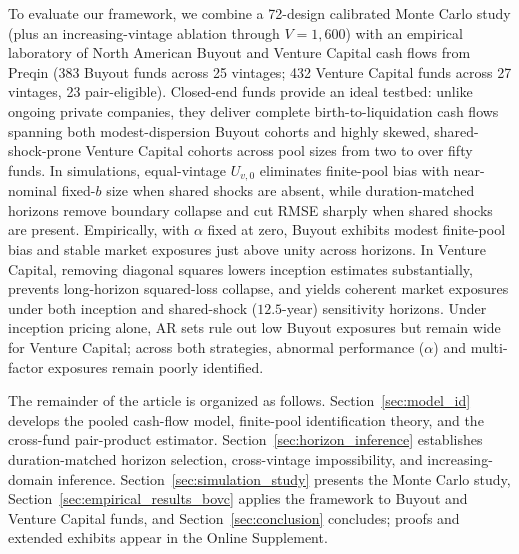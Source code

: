 \documentclass[12pt]{article}
\begin{document}
To evaluate our framework, we combine a 72-design calibrated Monte Carlo study (plus an increasing-vintage ablation through $V = 1{,}600$) with an empirical laboratory of North American Buyout and Venture Capital cash flows from Preqin (383 Buyout funds across 25 vintages; 432 Venture Capital funds across 27 vintages, 23 pair-eligible).
Closed-end funds provide an ideal testbed: unlike ongoing private companies, they deliver complete birth-to-liquidation cash flows spanning both modest-dispersion Buyout cohorts and highly skewed, shared-shock-prone Venture Capital cohorts across pool sizes from two to over fifty funds.
In simulations, equal-vintage $U_{v,0}$ eliminates finite-pool bias with near-nominal fixed-$b$ size when shared shocks are absent, while duration-matched horizons remove boundary collapse and cut RMSE sharply when shared shocks are present.
Empirically, with $\alpha$ fixed at zero, Buyout exhibits modest finite-pool bias and stable market exposures just above unity across horizons.
In Venture Capital, removing diagonal squares lowers inception estimates substantially, prevents long-horizon squared-loss collapse, and yields coherent market exposures under both inception and shared-shock ($12.5$-year) sensitivity horizons.
Under inception pricing alone, AR sets rule out low Buyout exposures but remain wide for Venture Capital; across both strategies, abnormal performance ($\alpha$) and multi-factor exposures remain poorly identified.

The remainder of the article is organized as follows.
Section~\ref{sec:model_id} develops the pooled cash-flow model, finite-pool identification theory, and the cross-fund pair-product estimator.
Section~\ref{sec:horizon_inference} establishes duration-matched horizon selection, cross-vintage impossibility, and increasing-domain inference.
Section~\ref{sec:simulation_study} presents the Monte Carlo study, Section~\ref{sec:empirical_results_bovc} applies the framework to Buyout and Venture Capital funds, and Section~\ref{sec:conclusion} concludes; proofs and extended exhibits appear in the Online Supplement.
\end{document}

